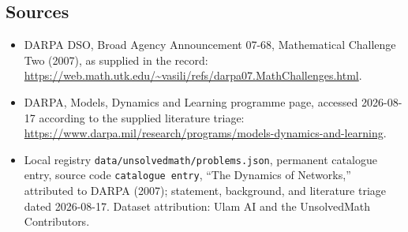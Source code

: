 \documentclass[11pt]{article}
\begin{document}
\subsection{Sources}
\begin{itemize}
\item DARPA DSO, Broad Agency Announcement 07-68, Mathematical Challenge Two (2007), as supplied in the record: \url{https://web.math.utk.edu/~vasili/refs/darpa07.MathChallenges.html}.
\item DARPA, Models, Dynamics and Learning programme page, accessed 2026-08-17 according to the supplied literature triage: \url{https://www.darpa.mil/research/programs/models-dynamics-and-learning}.
\item Local registry \texttt{data/unsolvedmath/problems.json}, permanent catalogue entry, source code \texttt{catalogue entry}, ``The Dynamics of Networks,'' attributed to DARPA (2007); statement, background, and literature triage dated 2026-08-17. Dataset attribution: Ulam AI and the UnsolvedMath Contributors.
\end{itemize}
\end{document}
